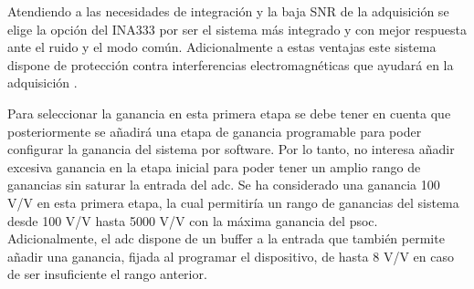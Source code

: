 \begin{table}[htbp]
  \centering
  
    \caption{Comparativa de opciones para selección del sistema de amplificación externa al \acrshort{psoc}}
  \label{tab:amp_dec}%
\end{table}%







Atendiendo a las necesidades de integración y la baja SNR de la adquisición se elige la opción del INA333 por ser el sistema más integrado y con mejor respuesta ante el ruido y el modo común. Adicionalmente a estas ventajas este sistema dispone de protección contra interferencias electromagnéticas que ayudará en la adquisición \cite{INA333}.

Para seleccionar la ganancia en esta primera etapa se debe tener en cuenta que posteriormente se añadirá una etapa de ganancia programable para poder configurar la ganancia del sistema por software. Por lo tanto, no interesa añadir excesiva ganancia en la etapa inicial para poder tener un amplio rango de ganancias sin saturar la entrada del \acrshort{adc}. Se ha considerado una ganancia 100 V/V en esta primera etapa, la cual permitiría un rango de ganancias del sistema desde 100 V/V hasta 5000 V/V con la máxima ganancia del \acrshort{psoc}. Adicionalmente, el \acrshort{adc} dispone de un buffer a la entrada que también permite añadir una ganancia, fijada al programar el dispositivo, de hasta 8 V/V en caso de ser insuficiente el rango anterior.


